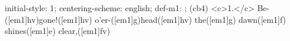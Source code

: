 initial-style: 1;
centering-scheme: english;
def-m1: \grealign;
(cb4) <c>1.</c> Be-([em1]hv)gone!([em1]hv) o'er-([em1]g)head([em1]hv) the([em1]g) dawn([em1]f) shines([em1]e) clear,([em1]fv)